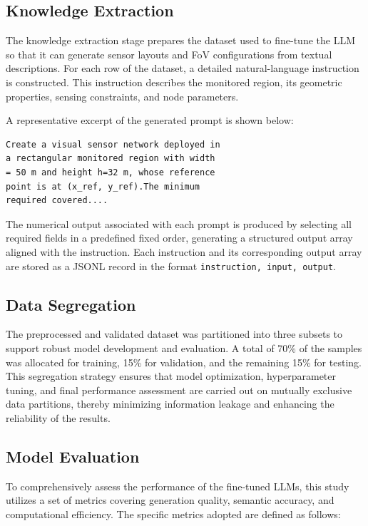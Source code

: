 \subsection{Knowledge Extraction}

The knowledge extraction stage prepares the dataset used to fine-tune the LLM so that it can generate sensor layouts and FoV configurations from textual descriptions. For each row of the dataset, a detailed natural-language instruction is constructed. This instruction describes the monitored region, its geometric properties, sensing constraints, and node parameters.

A representative excerpt of the generated prompt is shown below:

\begin{verbatim}
Create a visual sensor network deployed in
a rectangular monitored region with width
= 50 m and height h=32 m, whose reference
point is at (x_ref, y_ref).The minimum 
required covered....
\end{verbatim}


The numerical output associated with each prompt is produced by selecting all required fields in a predefined fixed order, generating a structured output array aligned with the instruction. Each instruction and its corresponding output array are stored as a JSONL record in the format \texttt{{instruction, input, output}}.


\subsection{Data Segregation}

The preprocessed and validated dataset was partitioned into three subsets to support robust model development and evaluation. A total of 70\% of the samples was allocated for training, 15\% for validation, and the remaining 15\% for testing. This segregation strategy ensures that model optimization, hyperparameter tuning, and final performance assessment are carried out on mutually exclusive data partitions, thereby minimizing information leakage and enhancing the reliability of the results.

\subsection{Model Evaluation}

To comprehensively assess the performance of the fine-tuned LLMs, this study utilizes a set of metrics covering generation quality, semantic accuracy, and computational efficiency. The specific metrics adopted are defined as follows:

